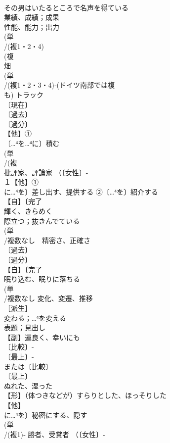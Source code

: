 \documentclass[8pt]{extreport}
\begin{document}
\begin{CJK}{UTF8}{min}
\\	その男はいたるところで名声を得ている
\\	業績、成績；成果　
\\	性能、能力；出力
\\	(単
\\	/(複1・2・4)
\\	(複
\\	畑 
\\	(単
\\	/(複1・2・3・4)‐(ドイツ南部では複
\\	も) トラック 
\\	〔現在〕
\\	〔過去〕
\\	〔過分〕
\\	【他】①
\\	〔…⁴を…⁴に〕積む 
\\	(単
\\	/(複
\\	批評家、評論家 （〔女性〕-
\\	１【他】①
\\	に…⁴を〕差し出す、提供する ②〔…⁴を〕紹介する
\\	【自】〔完了
\\	輝く、きらめく 
\\	際立つ；抜きんでている
\\	(単
\\	/複数なし　精密さ、正確さ 
\\	〔過去〕
\\	〔過分〕
\\	【自】〔完了
\\	眠り込む、眠りに落ちる
\\	(単
\\	/複数なし 変化、変遷、推移 
\\	［派生］ 
\\	変わる；…⁴を変える
\\	表題；見出し 
\\	【副】運良く、幸いにも 
\\	〔比較〕-
\\	〔最上〕-
\\	または〔比較〕
\\	〔最上〕
\\	ぬれた、湿った 
\\	【形】（体つきなどが）すらりとした、ほっそりした 
\\	【他】
\\	に…⁴を〕秘密にする、隠す 
\\	(単
\\	/(複1)‐ 勝者、受賞者 （〔女性〕-

\end{CJK}
\end{document}
